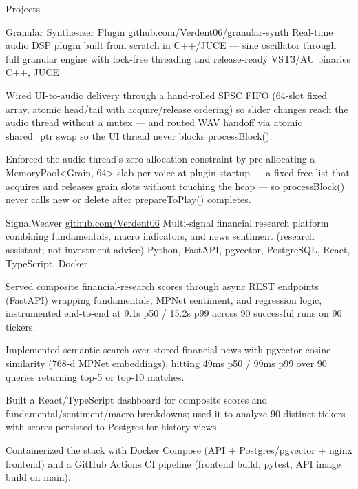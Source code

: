 \documentclass[
	11pt
]{../../../template}
\begin{document}
	\begin{rSection}{P}{rojects}
		\begin{rSectionEntry}
			{Granular Synthesizer Plugin}
			{\href{https://github.com/Verdent06/granular-synth}{github.com/Verdent06/granular-synth}}
			{Real-time audio DSP plugin built from scratch in C++/JUCE --- sine oscillator through full granular engine with lock-free threading and release-ready VST3/AU binaries}
			{C++, JUCE}
			{}

			\item Wired UI-to-audio delivery through a hand-rolled SPSC FIFO (64-slot fixed array, atomic head/tail with acquire/release ordering) so slider changes reach the audio thread without a mutex --- and routed WAV handoff via atomic shared\_ptr swap so the UI thread never blocks processBlock().
			\item Enforced the audio thread's zero-allocation constraint by pre-allocating a MemoryPool<Grain, 64> slab per voice at plugin startup --- a fixed free-list that acquires and releases grain slots without touching the heap --- so processBlock() never calls new or delete after prepareToPlay() completes.
		\end{rSectionEntry}

		\begin{rSectionEntry}
			{SignalWeaver}
			{\href{https://github.com/Verdent06}{github.com/Verdent06}}
			{Multi-signal financial research platform combining fundamentals, macro indicators, and news sentiment (research assistant; not investment advice)}
			{Python, FastAPI, pgvector, PostgreSQL, React, TypeScript, Docker}
			{}

			\item Served composite financial-research scores through async REST endpoints (FastAPI) wrapping fundamentals, MPNet sentiment, and regression logic, instrumented end-to-end at 9.1s p50 / 15.2s p99 across 90 successful runs on 90 tickers.
			\item Implemented semantic search over stored financial news with pgvector cosine similarity (768-d MPNet embeddings), hitting 49ms p50 / 99ms p99 over 90 queries returning top-5 or top-10 matches.
			\item Built a React/TypeScript dashboard for composite scores and fundamental/sentiment/macro breakdowns; used it to analyze 90 distinct tickers with scores persisted to Postgres for history views.
			\item Containerized the stack with Docker Compose (API + Postgres/pgvector + nginx frontend) and a GitHub Actions CI pipeline (frontend build, pytest, API image build on main).
		\end{rSectionEntry}
	\end{rSection}
\end{document}
